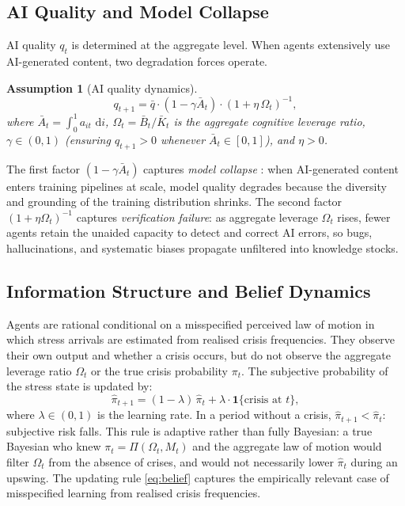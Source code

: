 \documentclass[12pt]{article}
\newtheorem{assumption}{Assumption}
\newcommand{\hpi}{\hat{\pi}}
\newcommand{\bA}{\bar{A}}
\newcommand{\bK}{\bar{K}}
\newcommand{\bB}{\bar{B}}
\newcommand{\diff}{\,\mathrm{d}}
\begin{document}
\subsection{AI Quality and Model Collapse}
\label{sec:ai_quality}

AI quality $q_t$ is determined at the aggregate level. When agents extensively use
AI-generated content, two degradation forces operate.

\begin{assumption}[AI quality dynamics]
\label{ass:quality}
\begin{equation}
q_{t+1} = \bar{q} \cdot (1 - \gamma \bA_t) \cdot (1 + \eta\, \Omega_t)^{-1},
\label{eq:quality}
\end{equation}
where $\bA_t = \int_0^1 a_{it}\, \diff i$, $\Omega_t = \bB_t / \bK_t$ is the
aggregate cognitive leverage ratio, $\gamma \in (0,1)$ (ensuring $q_{t+1} > 0$
whenever $\bA_t \in [0,1]$), and $\eta > 0$.
\end{assumption}

The first factor $(1 - \gamma \bA_t)$ captures \emph{model collapse}
\citep{ShumailovEtAl2024}: when AI-generated content enters training pipelines at
scale, model quality degrades because the diversity and grounding of the training
distribution shrinks. The second factor $(1 + \eta\Omega_t)^{-1}$ captures
\emph{verification failure}: as aggregate leverage $\Omega_t$ rises, fewer agents
retain the unaided capacity to detect and correct AI errors, so bugs, hallucinations,
and systematic biases propagate unfiltered into knowledge stocks.

\subsection{Information Structure and Belief Dynamics}
\label{sec:beliefs}

Agents are rational conditional on a misspecified perceived law of motion in which
stress arrivals are estimated from realised crisis frequencies. They observe their
own output and whether a crisis occurs, but do not observe the aggregate leverage
ratio $\Omega_t$ or the true crisis probability $\pi_t$. The subjective probability
of the stress state is updated by:
\begin{equation}
\hpi_{t+1} = (1-\lambda)\, \hpi_t + \lambda \cdot \mathbf{1}\{\text{crisis at } t\},
\label{eq:belief}
\end{equation}
where $\lambda \in (0,1)$ is the learning rate. In a period without a crisis,
$\hpi_{t+1} < \hpi_t$: subjective risk falls. This rule is adaptive rather than
fully Bayesian: a true Bayesian who knew $\pi_t = \Pi(\Omega_t, M_t)$ and the
aggregate law of motion would filter $\Omega_t$ from the absence of crises, and
would not necessarily lower $\hat\pi_t$ during an upswing. The updating rule
\eqref{eq:belief} captures the empirically relevant case of misspecified learning
from realised crisis frequencies.
\end{document}
